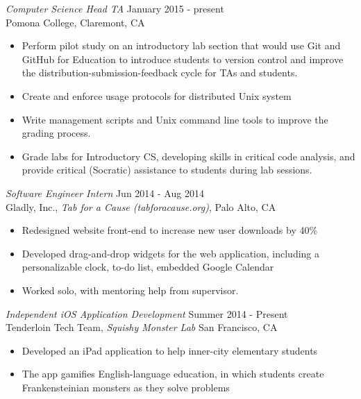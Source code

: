 \documentclass[margin, 10pt]{res} %
\begin{document}
\begin{resume}
{\sl Computer Science Head TA} \hfill January 2015 - present \\
Pomona College, Claremont, CA
\begin{itemize} \itemsep -2pt %
\item Perform pilot study on an introductory lab section that would use Git and GitHub for Education to introduce students to version control and improve the distribution-submission-feedback cycle for TAs and students.
\item Create and enforce usage protocols for distributed Unix system
\item Write management scripts and Unix command line tools to improve the grading process.
\item Grade labs for Introductory CS, developing skills in critical code analysis, and provide critical (Socratic) assistance to students during lab sessions.

\end{itemize}

{\sl Software Engineer Intern} \hfill Jun 2014 - Aug 2014 \\
Gladly, Inc., \textit{Tab for a Cause (tabforacause.org)}, Palo Alto, CA 
\begin{itemize} \itemsep -2pt %
\item Redesigned website front-end to increase new user downloads by 40\%
\item Developed drag-and-drop widgets for the web application, including a \\ personalizable clock, to-do list, embedded Google Calendar 
\item Worked solo, with mentoring help from supervisor.
\end{itemize}
 
{\sl Independent iOS Application Development} \hfill Summer 2014 - Present \\
Tenderloin Tech Team, \textit{Squishy Monster Lab} San Francisco, CA
\begin{itemize} \itemsep -2pt %
\item Developed an iPad application to help inner-city elementary students
\item The app gamifies English-language education, in which students create \\ Frankensteinian monsters as they solve problems
\end{itemize} 




\end{resume}
\end{document}
